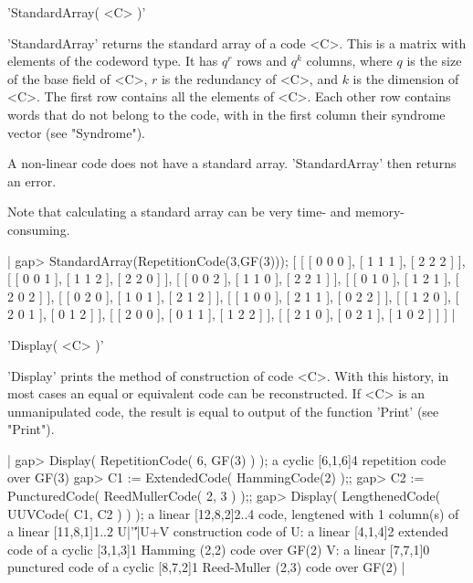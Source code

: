 
'StandardArray( <C> )'

'StandardArray'  returns the standard  array of   a  code <C>. This  is a
matrix  with elements of  the codeword type. It has  $q^r$ rows and $q^k$
columns,  where $q$ is  the size  of the base  field  of <C>, $r$  is the
redundancy   of <C>, and $k$    is the dimension   of <C>.  The first row
contains all the elements of <C>.  Each other row  contains words that do
not belong to  the code, with  in the first  column their syndrome vector
(see "Syndrome").

A non-linear code does  not have a  standard array.  'StandardArray' then
returns an error.

Note   that calculating a standard  array  can be  very time- and memory-
consuming.

|    gap> StandardArray(RepetitionCode(3,GF(3)));
    [ [ [ 0 0 0 ], [ 1 1 1 ], [ 2 2 2 ] ],
      [ [ 0 0 1 ], [ 1 1 2 ], [ 2 2 0 ] ],
      [ [ 0 0 2 ], [ 1 1 0 ], [ 2 2 1 ] ],
      [ [ 0 1 0 ], [ 1 2 1 ], [ 2 0 2 ] ],
      [ [ 0 2 0 ], [ 1 0 1 ], [ 2 1 2 ] ],
      [ [ 1 0 0 ], [ 2 1 1 ], [ 0 2 2 ] ],
      [ [ 1 2 0 ], [ 2 0 1 ], [ 0 1 2 ] ],
      [ [ 2 0 0 ], [ 0 1 1 ], [ 1 2 2 ] ],
      [ [ 2 1 0 ], [ 0 2 1 ], [ 1 0 2 ] ] ] |


'Display( <C> )'

'Display' prints  the  method of  construction  of  code <C>.  With  this
history,    in    most cases  an   equal    or equivalent   code   can be
reconstructed. If  <C> is an  unmanipulated code, the  result is equal to
output of the function 'Print' (see "Print").

|    gap> Display( RepetitionCode( 6, GF(3) ) );
    a cyclic [6,1,6]4 repetition code over GF(3)
    gap> C1 := ExtendedCode( HammingCode(2) );;
    gap> C2 := PuncturedCode( ReedMullerCode( 2, 3 ) );;
    gap> Display( LengthenedCode( UUVCode( C1, C2 ) ) );
    a linear [12,8,2]2..4 code, lengtened with 1 column(s) of
    a linear [11,8,1]1..2 U|'\|'|U+V construction code of
    U: a linear [4,1,4]2 extended code of
       a cyclic [3,1,3]1 Hamming (2,2) code over GF(2)
    V: a linear [7,7,1]0 punctured code of
       a cyclic [8,7,2]1 Reed-Muller (2,3) code over GF(2) |


